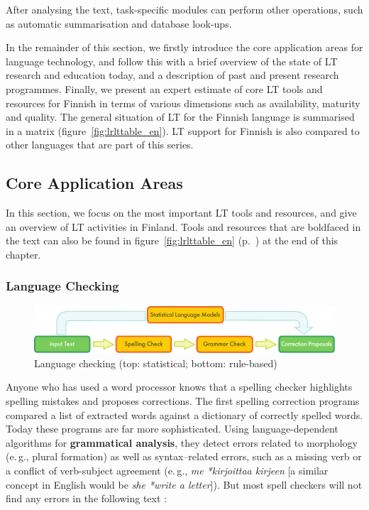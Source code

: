 \begin{multicols}{2}
After analysing the text, task-specific modules can perform other operations, such as automatic summarisation and database look-ups.

In the remainder of this section, we firstly introduce the core application areas for language technology, and follow this with a brief overview of the state of LT research and education today, and a description of past and present research programmes. Finally, we present an expert estimate of core LT tools and resources for Finnish in terms of various dimensions such as availability, maturity and quality. The general situation of LT for the Finnish language is summarised in a matrix (figure~\ref{fig:lrlttable_en}).  LT support for Finnish is also compared to other languages that are part of this series.

\subsection{Core Application Areas}

In this section, we focus on the most important LT tools and
resources, and give an overview of LT activities in Finland. 
Tools and resources that are boldfaced in the text can also be found in figure~\ref{fig:lrlttable_en} (p.~\pageref{fig:lrlttable_en}) at the end of this chapter. 

\subsubsection{Language Checking}

\begin{figure}[b]
  \center
  \includegraphics[width=\textwidth]{../_media/english/language_checking}
  \caption{Language checking (top: statistical; bottom: rule-based)}
  \label{fig:langcheckingarch-eng}
\end{figure}

Anyone who has used a word processor knows that a spelling checker highlights spelling mistakes and proposes corrections.  The first spelling correction programs compared a list of extracted words against a dictionary of correctly spelled words. Today these programs are far more sophisticated. Using language-dependent algorithms for \textbf{grammatical analysis}, they detect errors related to morphology (e.\,g., plural formation) as well as syntax–related errors, such as a missing verb or a conflict of verb-subject agreement (e.\,g., \textit{\foreignlanguage{finnish}{\textit{me *kirjoittaa kirjeen}}} [a similar concept in English would be \textit{she *write a letter}]).  But most spell checkers will not find any errors in the following text \cite{Surprise}:


\end{multicols}
